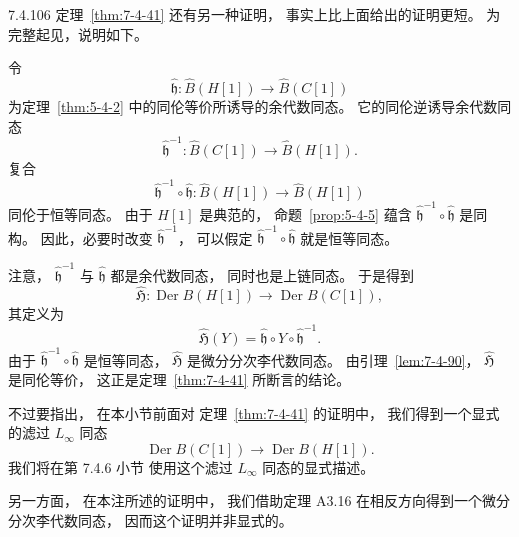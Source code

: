 
\begin{remark}{7.4.106}\label{rem:7-4-106}
定理~\ref{thm:7-4-41}
还有另一种证明，
事实上比上面给出的证明更短。
为完整起见，说明如下。

令
\[
\widehat{\mathfrak h}:
\widehat B(H[1])
\longrightarrow
\widehat B(C[1])
\]
为定理~\ref{thm:5-4-2}
中的同伦等价所诱导的余代数同态。
它的同伦逆诱导余代数同态
\[
\widehat{\mathfrak h}^{-1}:
\widehat B(C[1])
\longrightarrow
\widehat B(H[1]).
\]
复合
\[
\widehat{\mathfrak h}^{-1}
\circ\widehat{\mathfrak h}:
\widehat B(H[1])
\longrightarrow
\widehat B(H[1])
\]
同伦于恒等同态。
由于 $H[1]$ 是典范的，
命题~\ref{prop:5-4-5} 蕴含
$\widehat{\mathfrak h}^{-1}
\circ\widehat{\mathfrak h}$
是同构。
因此，必要时改变
$\widehat{\mathfrak h}^{-1}$，
可以假定
$\widehat{\mathfrak h}^{-1}
\circ\widehat{\mathfrak h}$
就是恒等同态。

注意，
$\widehat{\mathfrak h}^{-1}$
与 $\widehat{\mathfrak h}$
都是余代数同态，
同时也是上链同态。
于是得到
\[
\widehat{\mathfrak H}:
\operatorname{Der}B(H[1])
\longrightarrow
\operatorname{Der}B(C[1]),
\]
其定义为
\[
\widehat{\mathfrak H}(Y)
=
\widehat{\mathfrak h}
\circ Y
\circ\widehat{\mathfrak h}^{-1}.
\]
由于
$\widehat{\mathfrak h}^{-1}
\circ\widehat{\mathfrak h}$
是恒等同态，
$\widehat{\mathfrak H}$
是微分分次李代数同态。
由引理~\ref{lem:7-4-90}，
$\widehat{\mathfrak H}$
是同伦等价，
这正是定理~\ref{thm:7-4-41}
所断言的结论。

不过要指出，
在本小节前面对
定理~\ref{thm:7-4-41} 的证明中，
我们得到一个显式的滤过
$L_\infty$ 同态
\[
\operatorname{Der}B(C[1])
\longrightarrow
\operatorname{Der}B(H[1]).
\]
我们将在第 7.4.6 小节
使用这个滤过 $L_\infty$ 同态的显式描述。

另一方面，
在本注所述的证明中，
我们借助定理 A3.16
在相反方向得到一个微分分次李代数同态，
因而这个证明并非显式的。
\end{remark}
